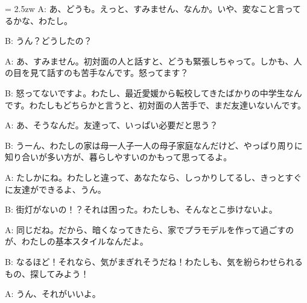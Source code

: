 \documentclass[11pt]{amsart}
\title{}
\author{}
\newenvironment{hangall}[1]{\hangindent = 2.5zw\everypar{\hangindent = 2.5zw}}{}
\begin{document}
\maketitle
\begin{hangall}{}%
A: あ、どうも。えっと、すみません、なんか。いや、変なこと言ってるかな、わたし。



B: うん？どうしたの？



A: あ、すみません。初対面の人と話すと、どうも緊張しちゃって。しかも、人の目を見て話すのも苦手なんです。怒ってます？



B: 怒ってないですよ。わたし、最近愛媛から転校してきたばかりの中学生なんです。わたしもどちらかと言うと、初対面の人苦手で、まだ友達いないんです。



A: あ、そうなんだ。友達って、いっぱい必要だと思う？



B: うーん、わたしの家は母一人子一人の母子家庭なんだけど、やっぱり周りに知り合いが多い方が、暮らしやすいのかもって思ってるよ。



A: たしかにね。わたしと違って、あなたなら、しっかりしてるし、きっとすぐに友達ができるよ、うん。



B: 街灯がないの！？それは困った。わたしも、そんなとこ歩けないよ。



A: 同じだね。だから、暗くなってきたら、家でプラモデルを作って過ごすのが、わたしの基本スタイルなんだよ。



B: なるほど！それなら、気がまぎれそうだね！わたしも、気を紛らわせられるもの、探してみよう！



A: うん、それがいいよ。\end{hangall}
\end{document}
